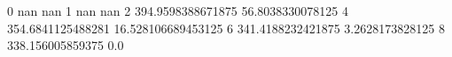 0 nan nan
1 nan nan
2 394.9598388671875 56.8038330078125
4 354.6841125488281 16.528106689453125
6 341.4188232421875 3.2628173828125
8 338.156005859375 0.0
